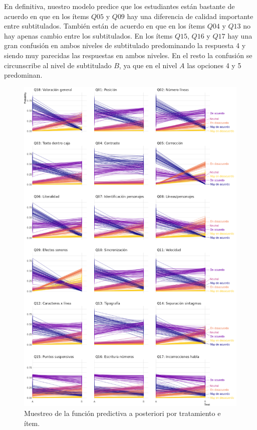 \documentclass[
  12pt,
  a4paper,
  extrafontsizes,
  onecolumn,
  openright,
  table]{memoir}
\begin{document}
En definitiva, nuestro modelo predice que los estudiantes están bastante
de acuerdo en que en los ítems \(Q05\) y \(Q09\) hay una diferencia de
calidad importante entre subtitulados. También están de acuerdo en que
en los ítems \(Q04\) y \(Q13\) no hay apenas cambio entre los
subtitulados. En los ítems \(Q15\), \(Q16\) y \(Q17\) hay una gran
confusión en ambos niveles de subtitulado predominando la respuesta 4 y
siendo muy parecidas las respuestas en ambos niveles. En el resto la
confusión se circunscribe al nivel de subtitulado \(B\), ya que en el
nivel \(A\) las opciones 4 y 5 predominan.

\begin{figure}[h]

{\centering \includegraphics[width=1\textwidth,height=\textheight]{images/bayes-preg.png}

}

\caption{\label{fig-pred-3}Muestreo de la función predictiva a
posteriori por tratamiento e ítem.}

\end{figure}
\end{document}
